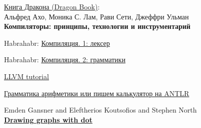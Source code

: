 
\begin{thebibliography}{99}


\href{https://drive.google.com/file/d/0B0u4WeMjO894LS1Jb3JUbEVSVkE/view?usp=sharing}{Книга Дракона (Dragon Book)}:\\
Альфред Ахо, Моника С. Лам, Рави Сети, Джеффри Ульман\\
\textbf{Компиляторы: принципы, технологии и инструментарий}


 Habrahabr: \href{http://habrahabr.ru/post/99162/}{Компиляция. 1: лексер}

 Habrahabr: \href{http://habrahabr.ru/post/99298/}{Компиляция. 2: грамматики}


 \href{http://llvm.org/docs/tutorial/}{LLVM tutorial}


 \href{http://habrahabr.ru/post/110710/}{Грамматика 
арифметики или пишем калькулятор на ANTLR}


Emden Gansner and Eleftherios Koutsofios and Stephen North\\
\textbf{\href{http://www.graphviz.org/Documentation/dotguide.pdf}{Drawing graphs with dot}}

\end{thebibliography}